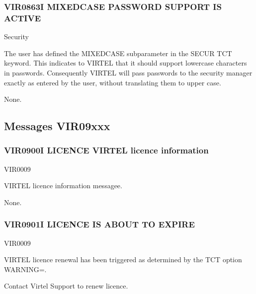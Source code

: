 \documentclass[letterpaper,10pt,english]{sphinxmanual}
\begin{document}
\subsubsection{VIR0863I MIXED\sphinxhyphen{}CASE PASSWORD SUPPORT IS ACTIVE}
\label{\detokenize{messages:vir0863i-mixed-case-password-support-is-active}}\begin{description}
\sphinxAtStartPar
Security

\sphinxAtStartPar
The user has defined the MIXEDCASE subparameter in the SECUR TCT keyword. This indicates to VIRTEL that it should support lower\sphinxhyphen{}case characters in passwords. Consequently VIRTEL will pass passwords to the security manager exactly as entered by the user, without translating them to upper case.

\sphinxAtStartPar
None.

\end{description}


\subsection{Messages VIR09xxx}
\label{\detokenize{messages:messages-vir09xxx}}

\subsubsection{VIR0900I LICENCE VIRTEL licence information}
\label{\detokenize{messages:vir0900i-licence-virtel-licence-information}}\begin{description}
\sphinxAtStartPar
VIR0009

\sphinxAtStartPar
VIRTEL licence information messagee.

\sphinxAtStartPar
None.

\end{description}


\subsubsection{VIR0901I LICENCE IS ABOUT TO EXPIRE}
\label{\detokenize{messages:vir0901i-licence-is-about-to-expire}}\begin{description}
\sphinxAtStartPar
VIR0009

\sphinxAtStartPar
VIRTEL licence renewal has been triggered as determined by the TCT option WARNING=.

\sphinxAtStartPar
Contact Virtel Support to renew licence.

\end{description}
\end{document}
